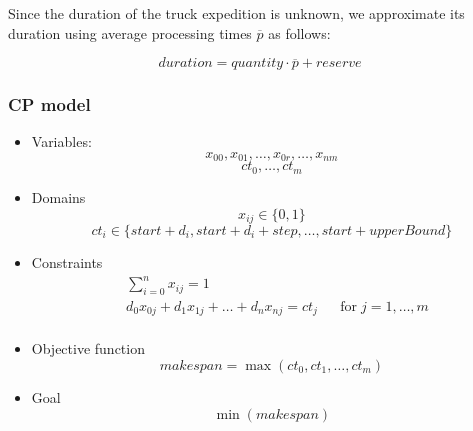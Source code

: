 \documentclass{ctuthesis}
\begin{document}
Since the duration of the truck expedition is unknown, we approximate its duration using average processing times $\overline{p}$ as follows:

\begin{equation}
     duration = quantity \cdot \overline{p} + reserve
\end{equation}

\subsubsection{CP model}

\begin{itemize}
    \item Variables:\\
    \begin{equation}
        x_{00}, x_{01}, \ldots, x_{0r}, \ldots, x_{nm}
    \end{equation}
    \begin{equation}
        ct_0, \ldots, ct_m
    \end{equation}
    \item Domains\\
    \begin{equation}
    x_{ij} \in \{0, 1\}
    \end{equation}
    \begin{equation}
    ct_{i} \in \{start+  d_i, start + d_i + step, \ldots, start + upperBound\}
    \end{equation}
    \item Constraints
    \begin{equation}
    \begin{aligned}
    & \sum_{i=0}^{n} x_{ij} = 1 &&\\
    & d_0x_{0j} + d_1x_{1j} + \ldots + d_nx_{nj} = ct_j && \text{for}\; j = 1, \ldots, m\\
    \end{aligned}
    \end{equation}
    \item Objective function\\
    \begin{equation}
        makespan = \max(ct_0, ct_1, \ldots, ct_m)
    \end{equation}
    \item Goal\\
    \begin{equation}
        \min(makespan)
    \end{equation}
\end{itemize}
\end{document}
